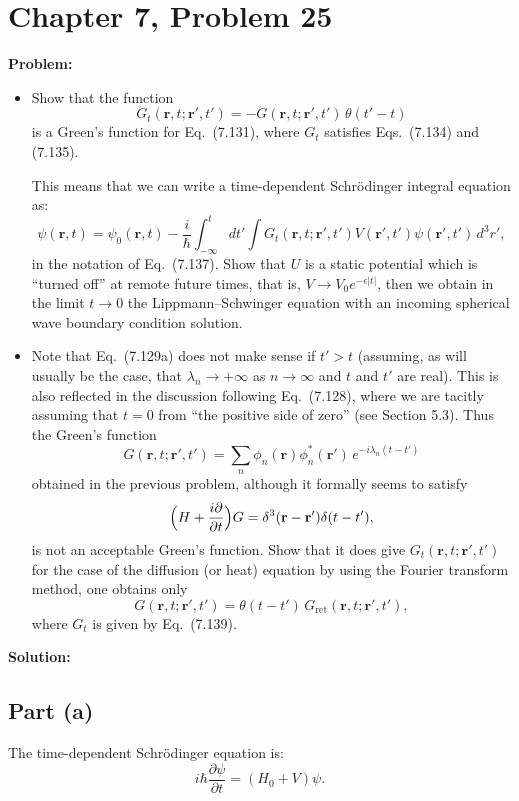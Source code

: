 \documentclass[12pt]{article}
\begin{document}
\section*{Chapter 7, Problem 25}

\textbf{Problem:}
\begin{itemize}
\item[a)] Show that the function
\[
G_t(\mathbf{r},t;\mathbf{r}',t') = -G(\mathbf{r},t;\mathbf{r}',t')\,\theta(t'-t)
\]
is a Green's function for Eq.\ (7.131), where $G_t$ satisfies Eqs.\ (7.134) and (7.135).

This means that we can write a time-dependent Schr\"odinger integral equation as:
\[
\psi(\mathbf{r},t) = \psi_0(\mathbf{r},t) - \frac{i}{\hbar}\int_{-\infty}^{t}dt'\int G_t(\mathbf{r},t;\mathbf{r}',t')V(\mathbf{r}',t')\psi(\mathbf{r}',t')\,d^3r',
\]
in the notation of Eq.\ (7.137). Show that $U$ is a static potential which is ``turned off'' at remote future times, that is, $V \to V_0 e^{-\epsilon|t|}$, then we obtain in the limit $t \to 0$ the Lippmann--Schwinger equation with an incoming spherical wave boundary condition solution.
\item[b)] Note that Eq.\ (7.129a) does not make sense if $t' > t$ (assuming, as will usually be the case, that $\lambda_n \to +\infty$ as $n \to \infty$ and $t$ and $t'$ are real). This is also reflected in the discussion following Eq.\ (7.128), where we are tacitly assuming that $t = 0$ from ``the positive side of zero'' (see Section 5.3). Thus the Green's function
\[
G(\mathbf{r},t;\mathbf{r}',t') = \sum_n \phi_n(\mathbf{r})\phi_n^*(\mathbf{r}')\,e^{-i\lambda_n(t-t')}
\]
obtained in the previous problem, although it formally seems to satisfy
\[
\Bigl(H + \frac{i\partial}{\partial t}\Bigr)G = \delta^3(\mathbf{r}-\mathbf{r}')\delta(t-t'),
\]
is not an acceptable Green's function. Show that it does give $G_t(\mathbf{r},t;\mathbf{r}',t')$ for the case of the diffusion (or heat) equation by using the Fourier transform method, one obtains only
\[
G(\mathbf{r},t;\mathbf{r}',t') = \theta(t-t')\,G_{\mathrm{ret}}(\mathbf{r},t;\mathbf{r}',t'),
\]
where $G_t$ is given by Eq.\ (7.139).
\end{itemize}

\bigskip
\textbf{Solution:}

\subsection*{Part (a)}

The time-dependent Schr\"odinger equation is:
\[
i\hbar\frac{\partial\psi}{\partial t} = (H_0 + V)\psi.
\]
\end{document}
